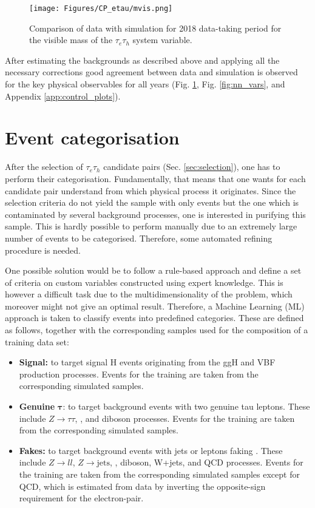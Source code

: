\begin{figure}[t!]
    \centering
    \texttt{[image: Figures/CP\_etau/mvis.png]}
    \caption{Comparison of data with simulation for 2018 data-taking period for the visible mass of the $\tau_e\tau_h$ system variable.}
    \label{fig:mvis}
\end{figure}

After estimating the backgrounds as described above and applying all the necessary corrections good agreement between data and simulation is observed for the key physical observables for all years (Fig. \ref{fig:mvis}, Fig. \ref{fig:nn_vars}, and Appendix \ref{app:control_plots}). 

\section{Event categorisation}\label{sec:categ}
After the selection of $\tau_e\tau_h$ candidate pairs (Sec. \ref{sec:selection}), one has to perform their categorisation. Fundamentally, that means that one wants for each candidate pair understand from which physical process it originates. Since the selection criteria do not yield the sample with only \htt events but the one which is contaminated by several background processes, one is interested in purifying this sample. This is hardly possible to perform manually due to an extremely large number of events to be categorised. Therefore, some automated refining procedure is needed.

One possible solution would be to follow a rule-based approach and define a set of criteria on custom variables constructed using expert knowledge. This is however a difficult task due to the multidimensionality of the problem, which moreover might not give an optimal result. Therefore, a Machine Learning (ML) approach is taken to classify events into predefined categories. These are defined as follows, together with the corresponding samples used for the composition of a training data set:

\begin{itemize}
    \item \textbf{Signal:} to target signal H events originating from the ggH and VBF production processes. Events for the training are taken from the corresponding simulated samples.
    \item \textbf{Genuine} $\mathbf{\tau}$: to target background events with two genuine tau leptons. These include $Z\to\tau\tau$, \ttbar, and diboson processes. Events for the training are taken from the corresponding simulated samples.
    \item \textbf{Fakes:} to target background events with jets or leptons faking \tauh. These include $Z\to ll$, $Z\to \text{jets}$, \ttbar, diboson, W+jets, and QCD processes. Events for the training are taken from the corresponding simulated samples except for QCD, which is estimated from data by inverting the opposite-sign requirement for the electron-\tauh pair. 
\end{itemize}

